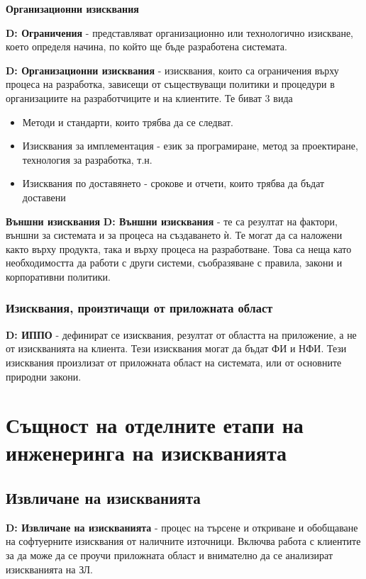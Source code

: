 \documentclass[fleqn,12pt]{article}
\begin{document}
\textbf{Организационни изисквания}

\bigbreak
\textbf{D: Ограничения} - представляват организационно или технологично изискване, което определя начина, по който ще бъде разработена системата.

\bigbreak
\textbf{D: Организационни изисквания} - изисквания, които са ограничения върху процеса на разработка, зависещи от съществуващи политики и процедури в организациите на разработчиците и на клиентите. Те биват 3 вида

\begin{itemize}
	\item Методи и стандарти, които трябва да се следват.
	\item Изисквания за имплементация - език за програмиране, метод за проектиране, технология за разработка, т.н.
	\item Изисквания по доставянето - срокове и отчети, които трябва да бъдат доставени
\end{itemize}

\textbf{Външни изисквания}
\bigbreak
\textbf{D: Външни изисквания} - те са резултат на фактори, външни за системата и за процеса на създаването ѝ. Те могат да са наложени както върху продукта, така и върху процеса на разработване. Това са неща като необходимостта да работи с други системи, съобразяване с правила, закони и корпоративни политики.


\subsubsection{Изисквания, произтичащи от приложната област}
\textbf{D: ИППО} - дефинират се изисквания, резултат от областта на приложение, а не от изискванията на клиента. Тези изисквания могат да бъдат ФИ и НФИ. Тези изисквания произлизат от приложната област на системата, или от основните природни закони.


\section{Същност на отделните етапи на инженеринга на изискванията}

\subsection{Извличане на изискванията}
\textbf{D: Извличане на изискванията} - процес на търсене и откриване и обобщаване на софтуерните изисквания от наличните източници. Включва работа с клиентите за да може да се проучи приложната област и внимателно да се анализират изискванията на ЗЛ.
\end{document}
